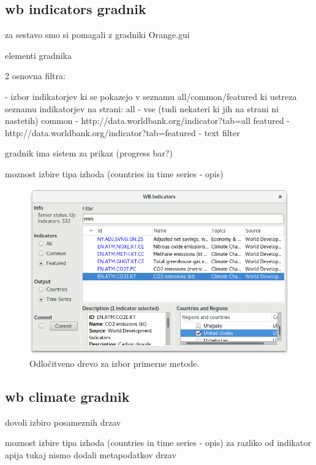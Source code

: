 \subsection{wb indicators gradnik}

za sestavo smo si pomagali z gradniki Orange.gui 

elementi gradnika

2 osnovna filtra: 

- izbor indikatorjev ki se pokazejo v seznamu all/common/featured 
  ki ustreza seznamu indikatorjev na strani: 
  all - vse (tudi nekateri ki jih na strani ni nastetih)
  common - http://data.worldbank.org/indicator?tab=all
  featured - http://data.worldbank.org/indicator?tab=featured
- text filter

gradnik ima sistem za prikaz (progress bar?) 

moznost izbire tipa izhoda (countries in time series - opis)

\begin{figure}
\begin{center}
\includegraphics[width=12cm]{pic/co2_temp_indicator_selection.png}
\end{center}
\caption{Odločitveno drevo za izbor primerne metode.}
\label{co2_temp_indicator}
\end{figure} 



\subsection{wb climate gradnik}

dovoli izbiro posameznih drzav 

moznost izbire tipa izhoda (countries in time series - opis)
za razliko od indikator apija tukaj nismo dodali metapodatkov drzav 



